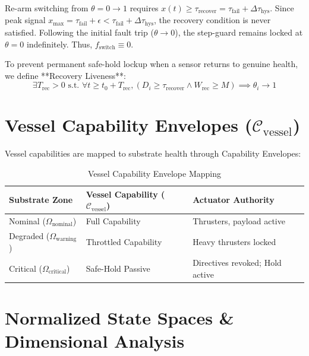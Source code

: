 \documentclass[conference]{IEEEtran}
\begin{document}
\begin{IEEEproof}
Re-arm switching from $\theta = 0 \to 1$ requires $x(t) \ge \tau_{\text{recover}} = \tau_{\text{fail}} + \Delta \tau_{\text{hys}}$. Since peak signal $x_{\text{max}} = \tau_{\text{fail}} + \epsilon < \tau_{\text{fail}} + \Delta \tau_{\text{hys}}$, the recovery condition is never satisfied. Following the initial fault trip ($\theta \to 0$), the step-guard remains locked at $\theta = 0$ indefinitely. Thus, $f_{\text{switch}} \equiv 0$.
\end{IEEEproof}

To prevent permanent safe-hold lockup when a sensor returns to genuine health, we define **Recovery Liveness**:
\begin{equation}
\exists T_{\text{rec}} > 0 \text{ s.t. } \forall t \ge t_0 + T_{\text{rec}}, (D_i \ge \tau_{\text{recover}} \land W_{\text{rec}} \ge M) \implies \theta_i \to 1
\end{equation}

\section{Vessel Capability Envelopes ($\mathcal{C}_{\text{vessel}}$)}

Vessel capabilities are mapped to substrate health through Capability Envelopes:

\begin{table}[htbp]
\caption{Vessel Capability Envelope Mapping}
\begin{center}
\begin{tabular}{lll}
\toprule
\textbf{Substrate Zone} & \textbf{Vessel Capability ($\mathcal{C}_{\text{vessel}}$)} & \textbf{Actuator Authority} \\
\midrule
Nominal ($\Omega_{\text{nominal}}$) & Full Capability & Thrusters, payload active \\
Degraded ($\Omega_{\text{warning}}$) & Throttled Capability & Heavy thrusters locked \\
Critical ($\Omega_{\text{critical}}$) & Safe-Hold Passive & Directives revoked; Hold active \\
\bottomrule
\end{tabular}
\label{tab:capability_envelopes}
\end{center}
\end{table}

\section{Normalized State Spaces \& Dimensional Analysis}
\end{document}
